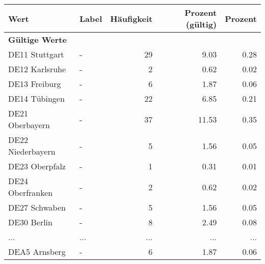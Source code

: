      \begin{longtable}{Xlrrr}
     \toprule
     \textbf{Wert} & \textbf{Label} & \textbf{Häufigkeit} & \textbf{Prozent (gültig)} & \textbf{Prozent} \\
     \endhead
     \midrule
     \multicolumn{5}{l}{\textbf{Gültige Werte}}\\
        \multicolumn{1}{X}{DE11 Stuttgart} & - & \num{29} & \num[round-mode=places,round-precision=2]{9.03} & \num[round-mode=places,round-precision=2]{0.28} \\
        \multicolumn{1}{X}{DE12 Karlsruhe} & - & \num{2} & \num[round-mode=places,round-precision=2]{0.62} & \num[round-mode=places,round-precision=2]{0.02} \\
        \multicolumn{1}{X}{DE13 Freiburg} & - & \num{6} & \num[round-mode=places,round-precision=2]{1.87} & \num[round-mode=places,round-precision=2]{0.06} \\
        \multicolumn{1}{X}{DE14 Tübingen} & - & \num{22} & \num[round-mode=places,round-precision=2]{6.85} & \num[round-mode=places,round-precision=2]{0.21} \\
        \multicolumn{1}{X}{DE21 Oberbayern} & - & \num{37} & \num[round-mode=places,round-precision=2]{11.53} & \num[round-mode=places,round-precision=2]{0.35} \\
        \multicolumn{1}{X}{DE22 Niederbayern} & - & \num{5} & \num[round-mode=places,round-precision=2]{1.56} & \num[round-mode=places,round-precision=2]{0.05} \\
        \multicolumn{1}{X}{DE23 Oberpfalz} & - & \num{1} & \num[round-mode=places,round-precision=2]{0.31} & \num[round-mode=places,round-precision=2]{0.01} \\
        \multicolumn{1}{X}{DE24 Oberfranken} & - & \num{2} & \num[round-mode=places,round-precision=2]{0.62} & \num[round-mode=places,round-precision=2]{0.02} \\
        \multicolumn{1}{X}{DE27 Schwaben} & - & \num{5} & \num[round-mode=places,round-precision=2]{1.56} & \num[round-mode=places,round-precision=2]{0.05} \\
        \multicolumn{1}{X}{DE30 Berlin} & - & \num{8} & \num[round-mode=places,round-precision=2]{2.49} & \num[round-mode=places,round-precision=2]{0.08} \\
       ... & ... & ... & ... & ... \\
        \multicolumn{1}{X}{DEA5 Arnsberg} & - & \num{6} & \num[round-mode=places,round-precision=2]{1.87} & \num[round-mode=places,round-precision=2]{0.06} \\

\end{longtable}
